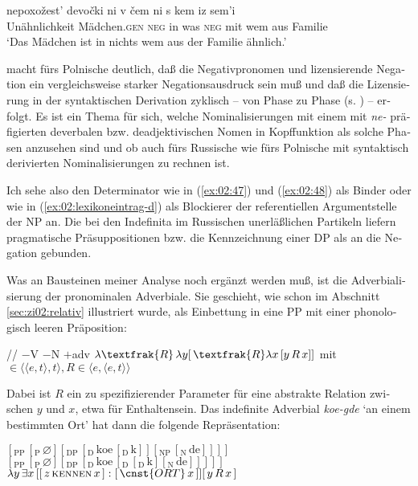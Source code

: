 \documentclass[output=paper, colorlinks, citecolor=brown, booklanguage=german]{langscibook}
\begin{document}
\begin{otherlanguage}{german}
{\ea\label{ex:02:fn22}
    \gll nepoxožest' devočki ni v čem ni s kem iz sem'i \\
    Unähnlichkeit Mädchen.\textsc{gen} \textsc{neg} in was \textsc{neg} mit wem aus Familie \\ 
    \glt ‘Das Mädchen ist in nichts wem aus der Familie ähnlich.’
\z 

\noindent \citet[Kap. 5 und 6]{Blaszczak2000} macht fürs Polnische deutlich, daß die Negativpronomen und lizensierende Negation ein vergleichsweise starker Negationsausdruck sein muß und daß die Lizensierung in der syntaktischen Derivation zyklisch -- von Phase zu Phase (s. \citealt{Chomsky1998,Chomsky1999}) -- erfolgt. Es ist ein Thema für sich, welche Nominalisierungen mit einem mit \textit{ne-} präfigierten deverbalen bzw. deadjektivischen Nomen in Kopffunktion als solche Phasen anzusehen sind und ob auch fürs Russische wie fürs Polnische mit syntaktisch deri\-vier\-ten Nominalisierungen zu rechnen ist.}

Ich sehe also den Determinator wie in (\ref{ex:02:47}) und (\ref{ex:02:48}) als Binder oder wie in (\ref{ex:02:lexikoneintrag-d}) als Blockierer der referentiellen Argumentstelle der NP an. Die bei den Indefinita im Russischen unerläßlichen Partikeln liefern pragmatische Präsuppositionen bzw. die Kennzeichnung einer DP als an die Negation gebunden.

Was an Bausteinen meiner Analyse noch ergänzt werden muß, ist die Adverbialisierung der pronominalen Adverbiale. Sie geschieht, wie schon im Abschnitt \ref{sec:zi02:relativ} illustriert wurde, als Einbettung in eine PP mit einer phonologisch leeren Präposition:

\ea\label{ex:02:52}
    \ea /\varnothing/
    \ex $-$V $-$N $+$adv
    \ex $\lambda\textfrak{R}\, \lambda y [\, \textfrak{R}\lambda x\, [y\, R\, x]]$ mit  $\in \langle\langle e,t\rangle,t\rangle, R \in \langle e, \langle e,t\rangle\rangle$
    \z
\z 

\noindent Dabei ist $R$ ein zu spezifizierender Parameter für eine abstrakte Relation zwi\-schen $y$ und $x$, etwa für Enthaltensein. Das indefinite Adverbial \textit{koe-gde} `an einem bestimmten Ort' hat dann die folgende Repräsentation:\enlargethispage{2\baselineskip}

\ea 
    \ea $[_\textrm{PP}\, [_\textrm{P}\, \varnothing ][_\textrm{DP}\, [_\textrm{D}\, \textrm{koe}\, [_\textrm{D}\, \textrm{k} ]][_\textrm{NP}\, [_\textrm{N}\, \textrm{de} ]]]]$
    \ex $[_\textrm{PP}\, [_\textrm{P}\, \varnothing ][_\textrm{DP}\, [_\textrm{D}\, \textrm{koe}\, [_\textrm{D}\, [_\textrm{D}\, \textrm{k} ][_\textrm{N}\, \textrm{de}]]]]]$
    \ex $\lambda y\, \exists x\, [[\, z\, \textsc{kennen}\, x \,] : [\, \cnst{ORT}\, x \,]][\, y\, R\, x \,]$
    \z
\z 


\end{otherlanguage}
\end{document}
